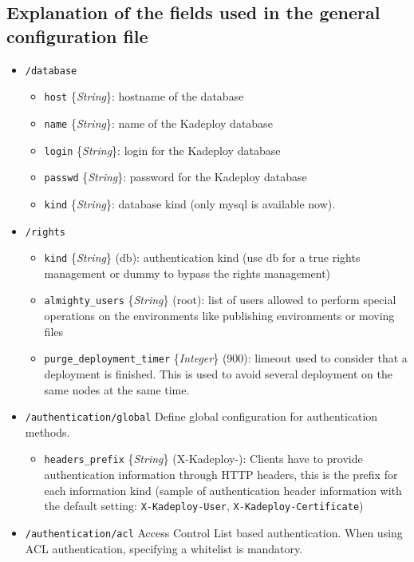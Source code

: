 \documentclass[a4wide,10pt,oneside]{book}
\newcommand{\ypath}[1]{\texttt{#1}}
\newcommand{\yfield}[2]{\texttt{#1} {\small\{{\emph{#2}}\}}:}
\newcommand{\yfieldd}[3]{\texttt{#1} {\small\{{\emph{#2}}\}} {\small(}#3{\small)}:}
\begin{document}
\subsection{Explanation of the fields used in the general configuration file}
\begin{itemize}
  \item \ypath{/database}
  \begin{itemize}
    \item \yfield{host}{String} hostname of the database
    \item \yfield{name}{String} name of the Kadeploy database
    \item \yfield{login}{String} login for the Kadeploy database
    \item \yfield{passwd}{String} password for the Kadeploy database
    \item \yfield{kind}{String} database kind (only mysql is available now).
  \end{itemize}

  \item \ypath{/rights}
  \begin{itemize}
    \item \yfieldd{kind}{String}{db} authentication kind (use db for a true rights management or dummy to bypass the rights management)
    \item \yfieldd{almighty\_users}{String}{root} list of users allowed to perform special operations on the environments like publishing environments or moving files
    \item \yfieldd{purge\_deployment\_timer}{Integer}{900} limeout used to consider that a deployment is finished. This is used to avoid several deployment on the same nodes at the same time.
  \end{itemize}

  \item \ypath{/authentication/global} Define global configuration for authentication methods.
  \begin{itemize}
    \item \yfieldd{headers\_prefix}{String}{X-Kadeploy-} Clients have to provide authentication information through HTTP headers, this is the prefix for each information kind (sample of authentication header information with the default setting: \texttt{X-Kadeploy-User}, \texttt{X-Kadeploy-Certificate})
  \end{itemize}

  \item \ypath{/authentication/acl} Access Control List based authentication. When using ACL authentication, specifying a whitelist is mandatory.


\end{itemize}
\end{document}
